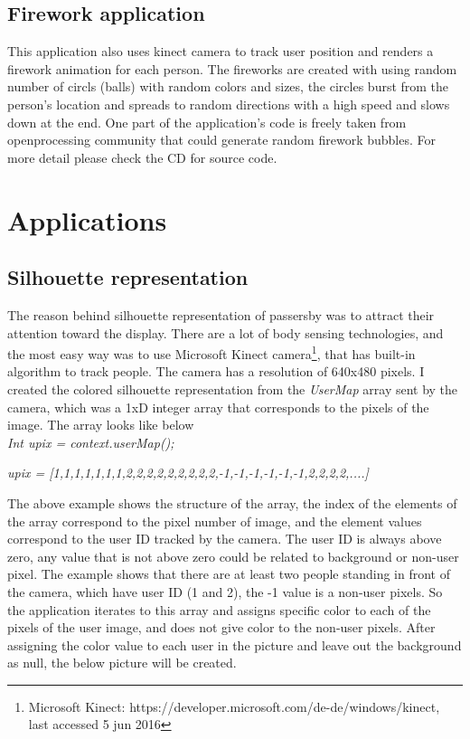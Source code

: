 \subsection{Firework application}
This application also uses kinect camera to track user position and renders a firework animation for each person.
The fireworks are created with using random number of circls (balls) with random colors and sizes, the circles burst from the person's location and spreads to random directions with a high speed and slows down at the end. One part of the application's code is freely taken from openprocessing community that could generate random firework bubbles.
For more detail please check the CD for source code.
\fi


\section{Applications}

\subsection{Silhouette representation}
The reason behind silhouette representation of passersby was to attract their attention toward the display. There are a lot of body sensing technologies, and the most easy way was to use Microsoft Kinect camera\footnote{Microsoft Kinect: https://developer.microsoft.com/de-de/windows/kinect, last accessed 5 jun 2016}, that has built-in algorithm to track people. The camera has a resolution of 640x480 pixels. I created the colored silhouette representation from the \emph{UserMap} array sent by the camera, which was a 1xD integer array that corresponds to the pixels of the image. The array looks like below \\

\emph {Int upix = context.userMap();}

\emph{upix = [1,1,1,1,1,1,1,2,2,2,2,2,2,2,2,2,-1,-1,-1,-1,-1,-1,2,2,2,2,....]}

The above example shows the structure of the array, the index of the elements of the array correspond to the pixel number of image, and the element values correspond to the user ID tracked by the camera. The user ID is always above zero, any value that is not above zero could be related to background or non-user pixel. The example shows that there are at least two people standing in front of the camera, which have user ID (1 and 2), the -1 value is a non-user pixels. 
So the application iterates to this array and assigns specific color to each of the pixels of the user image, and does not give color to the non-user pixels. After assigning the color value to each user in the picture and leave out the background as null, the below picture will be created.




